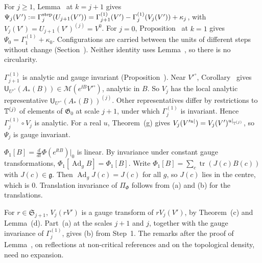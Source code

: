 \begin{detail}\label{d11a:B6}
\begin{step}
For $j\ge1$, Lemma~ at $k=j+1$ gives $\Psi_j(V'):=\Gamma^{\rm step}_j(U_{j+1}(V'))=\Gamma^{(1)}_{j+1}(V')-\Gamma^{(1)}_j(V_j(V'))+\kappa_j$, with $V_j(V')=U_{j+1}(V')^{(j)}=V^0$. For $j=0$, Proposition~ at $k=1$ gives $\Psi_0=\Gamma^{(1)}_1+\kappa_0$. Configurations are carried between the units of different steps without change (Section~). Neither identity uses Lemma~, so there is no circularity.
\end{step}
\begin{step}
$\Gamma^{(1)}_{j+1}$ is analytic and gauge invariant (Proposition~). Near $V'^\circ$, Corollary~ gives $\mathsf U_{U'^\circ}(A_*(B))\in\mathscr M(e^{\ii B}V'^\circ)$, analytic in $B$. So $V_j$ has the local analytic representative $\mathsf U_{U'^\circ}(A_*(B))^{(j)}$. Other representatives differ by restrictions to $\mathbb T^{(j)}$ of elements of $\mathfrak G_0$ at scale $j+1$, under which $\Gamma^{(1)}_j$ is invariant. Hence $\Gamma^{(1)}_j\circ V_j$ is analytic. For a real $u$, Theorem~(g) gives $V_j(V'^{u|})=V_j(V')^{u|_{\mathbb T^{(j)}}}$, so $\Psi_j$ is gauge invariant.
\end{step}
\begin{step}
$\Phi_1[B]=\frac d{dt}\Phi(e^{\ii tB})|_0$ is linear. By invariance under constant gauge transformations, $\Phi_1[\operatorname{Ad}_gB]=\Phi_1[B]$. Write $\Phi_1[B]=\sum_c\operatorname{tr}(J(c)B(c))$ with $J(c)\in\mathfrak g$. Then $\operatorname{Ad}_gJ(c)=J(c)$ for all $g$, so $J(c)$ lies in the centre, which is $0$. Translation invariance of $\Pi_\Phi$ follows from (a) and (b) for the translations.
\end{step}
\begin{step}
For $r\in\mathfrak S_{j+1}$, $V_j(rV')$ is a gauge transform of $rV_j(V')$, by Theorem~(c) and Lemma~(d). Part~(a) at the scales $j+1$ and $j$, together with the gauge invariance of $\Gamma^{(1)}_j$, gives (b) from Step~1. The remarks after the proof of Lemma~, on reflections at non-critical references and on the topological density, need no expansion.
\end{step}
\end{detail}

